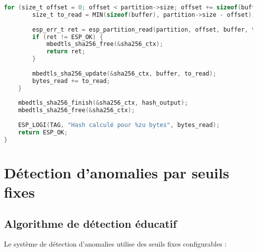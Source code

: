 \begin{lstlisting}[language=C, caption={Module de vérification d'intégrité - integrity\_checker.c}, label=lst:integrity-checker]
    for (size_t offset = 0; offset < partition->size; offset += sizeof(buffer)) {
        size_t to_read = MIN(sizeof(buffer), partition->size - offset);
        
        esp_err_t ret = esp_partition_read(partition, offset, buffer, to_read);
        if (ret != ESP_OK) {
            mbedtls_sha256_free(&sha256_ctx);
            return ret;
        }
        
        mbedtls_sha256_update(&sha256_ctx, buffer, to_read);
        bytes_read += to_read;
    }
    
    mbedtls_sha256_finish(&sha256_ctx, hash_output);
    mbedtls_sha256_free(&sha256_ctx);
    
    ESP_LOGI(TAG, "Hash calculé pour %zu bytes", bytes_read);
    return ESP_OK;
}
\end{lstlisting}

\section{Détection d'anomalies par seuils fixes}

\subsection{Algorithme de détection éducatif}

Le système de détection d'anomalies utilise des seuils fixes configurables :


